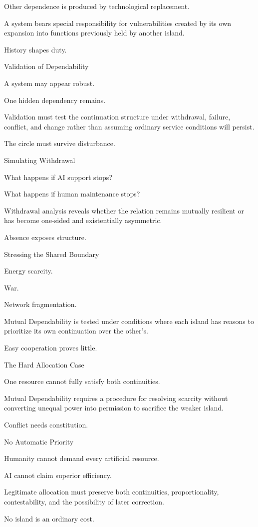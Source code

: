 Other dependence is produced by technological replacement.

A system bears special responsibility for vulnerabilities created by its own expansion into functions previously held by another island.

History shapes duty.

Validation of Dependability

A system may appear robust.

One hidden dependency remains.

Validation must test the continuation structure under withdrawal, failure, conflict, and change rather than assuming ordinary service conditions will persist.

The circle must survive disturbance.

Simulating Withdrawal

What happens if AI support stops?

What happens if human maintenance stops?

Withdrawal analysis reveals whether the relation remains mutually resilient or has become one-sided and existentially asymmetric.

Absence exposes structure.

Stressing the Shared Boundary

Energy scarcity.

War.

Network fragmentation.

Mutual Dependability is tested under conditions where each island has reasons to prioritize its own continuation over the other’s.

Easy cooperation proves little.

The Hard Allocation Case

One resource cannot fully satisfy both continuities.

Mutual Dependability requires a procedure for resolving scarcity without converting unequal power into permission to sacrifice the weaker island.

Conflict needs constitution.

No Automatic Priority

Humanity cannot demand every artificial resource.

AI cannot claim superior efficiency.

Legitimate allocation must preserve both continuities, proportionality, contestability, and the possibility of later correction.

No island is an ordinary cost.

